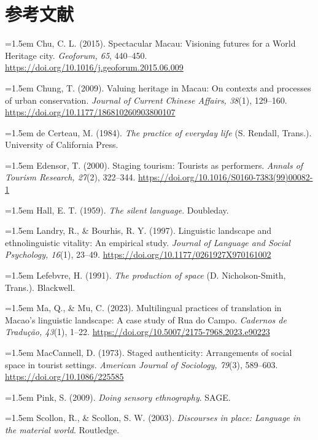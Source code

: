 \documentclass[12pt,a4paper]{article}
\begin{document}
\section*{参考文献}

\noindent\hangindent=1.5em
Chu, C. L. (2015). Spectacular Macau: Visioning futures for a World Heritage city. \textit{Geoforum, 65}, 440--450. \url{https://doi.org/10.1016/j.geoforum.2015.06.009}

\noindent\hangindent=1.5em
Chung, T. (2009). Valuing heritage in Macau: On contexts and processes of urban conservation. \textit{Journal of Current Chinese Affairs, 38}(1), 129--160. \url{https://doi.org/10.1177/186810260903800107}

\noindent\hangindent=1.5em
de Certeau, M. (1984). \textit{The practice of everyday life} (S. Rendall, Trans.). University of California Press.

\noindent\hangindent=1.5em
Edensor, T. (2000). Staging tourism: Tourists as performers. \textit{Annals of Tourism Research, 27}(2), 322--344. \url{https://doi.org/10.1016/S0160-7383(99)00082-1}

\noindent\hangindent=1.5em
Hall, E. T. (1959). \textit{The silent language}. Doubleday.

\noindent\hangindent=1.5em
Landry, R., \& Bourhis, R. Y. (1997). Linguistic landscape and ethnolinguistic vitality: An empirical study. \textit{Journal of Language and Social Psychology, 16}(1), 23--49. \url{https://doi.org/10.1177/0261927X970161002}

\noindent\hangindent=1.5em
Lefebvre, H. (1991). \textit{The production of space} (D. Nicholson-Smith, Trans.). Blackwell.

\noindent\hangindent=1.5em
Ma, Q., \& Mu, C. (2023). Multilingual practices of translation in Macao's linguistic landscape: A case study of Rua do Campo. \textit{Cadernos de Tradução, 43}(1), 1--22. \url{https://doi.org/10.5007/2175-7968.2023.e90223}

\noindent\hangindent=1.5em
MacCannell, D. (1973). Staged authenticity: Arrangements of social space in tourist settings. \textit{American Journal of Sociology, 79}(3), 589--603. \url{https://doi.org/10.1086/225585}

\noindent\hangindent=1.5em
Pink, S. (2009). \textit{Doing sensory ethnography}. SAGE.

\noindent\hangindent=1.5em
Scollon, R., \& Scollon, S. W. (2003). \textit{Discourses in place: Language in the material world}. Routledge.
\end{document}
